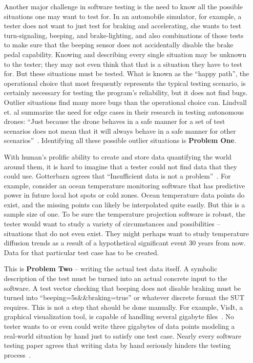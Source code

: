 Another major challenge in software testing is the need to know all the possible situations one may want to test for. In an automobile simulator, for example, a tester does not want to just test for braking and accelerating, she wants to test turn-signaling, beeping, and brake-lighting, and also combinations of those tests to make sure that the beeping sensor does not accidentally disable the brake pedal capability. Knowing and describing every single situation may be unknown to the tester; they may not even think that that is a situation they have to test for. But these situations must be tested. What is known as the ``happy path'', the operational choice that most frequently represents the typical testing scenario, is certainly necessary for testing the program’s reliability, but it does not find bugs. Outlier situations find many more bugs than the operational choice can. Lindvall et. al summarize the need for edge cases in their research in testing autonomous drones: ``Just because the drone behaves in a safe manner for a set of test scenarios does not mean that it will always behave in a safe manner for other scenarios''~\cite{Lindvall:2017:MMT:3103620.3103632}. Identifying all these possible outlier situations is \textbf{Problem One}.

With human's prolific ability to create and store data quantifying the world around them, it is hard to imagine that a tester could not find data that they could use. Gotterbarn agrees that ``Insufficient data is not a problem''~\cite{Gotterbarn:2016:CFC:2874239.2874248}. For example, consider an ocean temperature monitoring software that has predictive power in future local hot spots or cold zones. Ocean temperature data points do exist, and the missing points can likely be interpolated quite easily. But this is a sample size of one. To be sure the temperature projection software is robust, the tester would want to study a variety of circumstances and possibilities – situations that do not even exist. They might perhaps want to study temperature diffusion trends as a result of a hypothetical significant event 30 years from now. Data for that particular test case has to be created.

This is \textbf{Problem Two} -- writing the actual test data itself. A symbolic description of the test must be turned into an actual concrete input to the software. A test vector checking that beeping does not disable braking must be turned into ``beeping=5s\&\&braking=true'' or whatever discrete format the SUT requires. This is not a step that should be done manually. For example, VisIt, a graphical visualization tool, is capable of handling several gigabyte files~\cite{VisIt}. No tester wants to or even could write three gigabytes of data points modeling a real-world situation by hand just to satisfy one test case. Nearly every software testing paper agrees that writing data by hand seriously hinders the testing process~\cite{Misailovic:2007:PTG:1287624.1287645,Murphy:2007:PRT:1292414.1292425,Palka:2011:TOC:1982595.1982615,Patrick:2016:ATI:2970276.2970333}.

